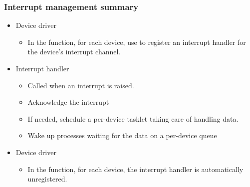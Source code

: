 \begin{frame}
  \frametitle{Interrupt management summary}
  \begin{itemize}
  \item Device driver
    \begin{itemize}
    \item In the  function, for each device,
      use  to register an interrupt handler
      for the device's interrupt channel.
    \end{itemize}
  \item Interrupt handler
    \begin{itemize}
    \item Called when an interrupt is raised.
    \item Acknowledge the interrupt
    \item If needed, schedule a per-device tasklet taking care of handling
      data.
    \item Wake up processes waiting for the data on a per-device queue
    \end{itemize}
  \item Device driver
    \begin{itemize}
    \item In the  function, for each device, the
      interrupt handler is automatically unregistered.
    \end{itemize}
  \end{itemize}
\end{frame}
